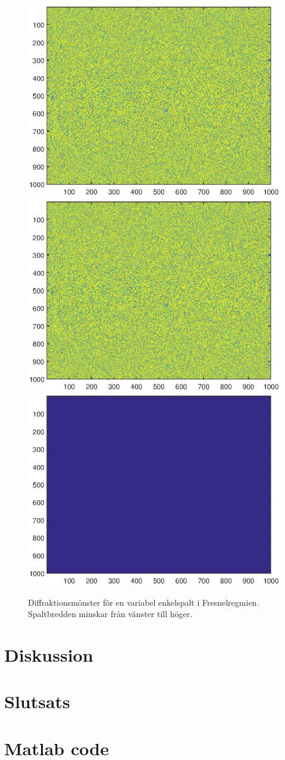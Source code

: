 \documentclass[a4paper]{article}
\begin{document}
\FloatBarrier

\FloatBarrier

\begin{figure}[h!]
	\centering
	\includegraphics[width=0.3\linewidth]{Data/Figurer/simuleringBabinet1.eps}
	\includegraphics[width=0.3\linewidth]{Data/Figurer/simuleringBabinet2.eps}
	\includegraphics[width=0.3\linewidth]{Data/Figurer/simuleringBabinet3.eps}
	\caption{Diffraktionsmönster för en variabel enkelspalt i Fresnelregmien. Spaltbredden minskar från vänster till höger.}
	\label{fig:fresnelEnkel}
\end{figure}

\FloatBarrier

\section{Diskussion}

\section{Slutsats}
 
 {}
 

\appendix

\section{Matlab code}
\end{document}
